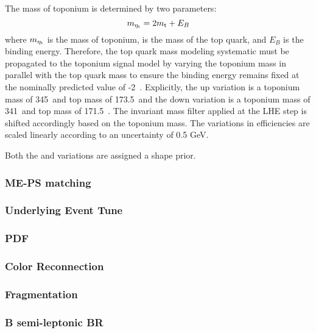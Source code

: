 The mass of toponium is determined by two parameters:
\begin{equation}
\label{eq:toponium_mass}
m_{\eta_{\mathrm{t}}} = 2m_{\mathrm{t}} + E_B
\end{equation}
where $m_{\eta_{\mathrm{t}}}$ is the mass of toponium, \mt is the mass of the top quark, and $E_B$ is the binding energy. Therefore, the top quark mass modeling systematic must be propagated to the toponium signal model by varying the toponium mass in parallel with the top quark mass to ensure the binding energy remains fixed at the nominally predicted value of -2~\GeV. Explicitly, the up variation is a toponium mass of 345~\GeV and top mass of 173.5~\GeV and the down variation is a toponium mass of 341~\GeV and top mass of 171.5~\GeV. The invariant mass filter applied at the LHE step is shifted accordingly based on the toponium mass. The variations in efficiencies are scaled linearly according to an uncertainty of 0.5 GeV.

Both the \ttbar and \etat variations are assigned a shape prior.

\subsubsection{ ME-PS matching }
\label{sec:MEPSMatching}

\subsubsection{ Underlying Event Tune }
\label{sec:UETune}

\subsubsection{ PDF}
\label{sec:PDF}

\subsubsection{Color Reconnection}
\label{sec:ColorReco}

\subsubsection{Fragmentation}
\label{sec:Frag}

\subsubsection{B semi-leptonic BR}
\label{sec:BsemilepBR}

